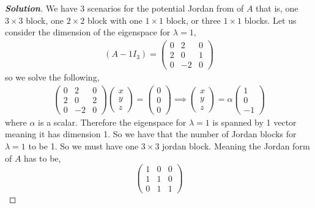 \documentclass[11pt]{article}
\newenvironment{solution}{\begin{proof}[\textbf{\textit{Solution}}] }{\end{proof}}
\begin{document}
\begin{itemize}
\begin{solution}
            We have 3 scenarios for the potential Jordan from of $A$ that is, one $3\times3$ block, one $2\times 2$ block with one $1\times 1$ block, or three $1\times 1$ blocks. Let us consider the dimension of the eigenspace for $\lambda = 1$,
            \begin{align*}
                (A - 1I_3) = \begin{pmatrix}
                    0 & 2 & 0 \\
                    2 & 0 & 1 \\
                    0 & -2 & 0 
                \end{pmatrix}
            \end{align*}
            so we solve the following,
            \begin{align*}
                \begin{pmatrix}
                    0 & 2 & 0 \\
                    2 & 0 & 2 \\
                    0 & -2 & 0 
                \end{pmatrix} \begin{pmatrix}
                    x \\ y \\ z
                \end{pmatrix} = \begin{pmatrix}0 \\ 0 \\ 0 \end{pmatrix} \implies \begin{pmatrix}
                    x \\ y \\ z
                \end{pmatrix} = \alpha\begin{pmatrix}
                    1 \\ 0 \\ -1
                \end{pmatrix} 
            \end{align*}
            where $\alpha$ is a scalar. Therefore the eigenspace for $\lambda = 1$ is spanned by 1 vector meaning it has dimension 1. So we have that the number of Jordan blocks for $\lambda =1$ to be 1. So we must have one $3\times 3$ jordan block. Meaning the Jordan form of $A$ has to be,
            \[\begin{pmatrix}
                1 & 0 & 0 \\
                1 & 1 & 0 \\
                0 & 1 & 1
            \end{pmatrix}\]
            
        \end{solution}
\end{itemize}
\end{document}

